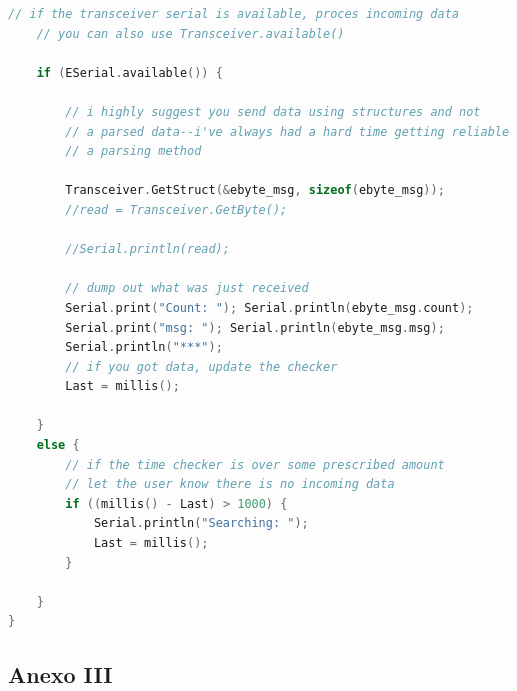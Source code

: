 \documentclass[12pt]{article}
\begin{document}
\begin{lstlisting}[language=C]
	// if the transceiver serial is available, proces incoming data
	// you can also use Transceiver.available()
	
	if (ESerial.available()) {
		
		// i highly suggest you send data using structures and not
		// a parsed data--i've always had a hard time getting reliable data using
		// a parsing method
		
		Transceiver.GetStruct(&ebyte_msg, sizeof(ebyte_msg));
		//read = Transceiver.GetByte();
		
		//Serial.println(read);
		
		// dump out what was just received
		Serial.print("Count: "); Serial.println(ebyte_msg.count);
		Serial.print("msg: "); Serial.println(ebyte_msg.msg);
		Serial.println("***");
		// if you got data, update the checker
		Last = millis();
		
	}
	else {
		// if the time checker is over some prescribed amount
		// let the user know there is no incoming data
		if ((millis() - Last) > 1000) {
			Serial.println("Searching: ");
			Last = millis();
		}
		
	}
}
	\end{lstlisting}

	\pagebreak
	
	\subsection*{Anexo III}
	\label{subsection: presupuesto}
	
	\pagebreak
	
\end{document}
